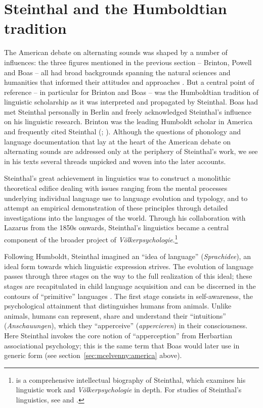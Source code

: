 \documentclass[output=paper]{langscibook}
\begin{document}
\section{Steinthal and the Humboldtian tradition}
\label{sec:mcelvenny:humboldtian}

The American debate on alternating sounds was shaped by a number of influences: the three figures mentioned in the previous section – Brinton, Powell and Boas – all had broad backgrounds spanning the natural sciences and humanities that informed their attitudes and approaches \citep[see][]{Darnell1998}. But a central point of reference – in particular for Brinton and Boas – was the Humboldtian tradition of linguistic scholarship as it was interpreted and propagated by Steinthal. Boas had met Steinthal personally in Berlin and freely acknowledged Steinthal's influence on his linguistic research. Brinton was the leading Humboldt scholar in America and frequently cited Steinthal (\citealt[see][63-69]{Bunzl1996}; \citealt[289-292]{TrautmannWaller2006}). Although the questions of phonology and language documentation that lay at the heart of the American debate on alternating sounds are addressed only at the periphery of Steinthal's work, we see in his texts several threads unpicked and woven into the later accounts.

Steinthal's great achievement in linguistics was to construct a monolithic theoretical edifice dealing with issues ranging from the mental processes underlying individual language use to language evolution and typology, and to attempt an empirical demonstration of these principles through detailed investigations into the languages of the world. Through his collaboration with Lazarus from the 1850s onwards, Steinthal's linguistics became a central component of the broader project of \emph{Völkerpsychologie}.\footnote{\citet{TrautmannWaller2006} is a comprehensive intellectual biography of Steinthal, which examines his linguistic work and \emph{Völkerpsychologie} in depth. For studies of Steinthal's linguistics, see \citet{Bumann1965} and \citet{Ringmacher1996}.} 

Following Humboldt, Steinthal imagined an ``idea of language'' (\emph{Sprachidee}), an ideal form towards which linguistic expression strives. The evolution of language passes through three stages on the way to the full realization of this ideal; these stages are recapitulated in child language acquisition and can be discerned in the contours of ``primitive'' languages \citep[cf.][81-93]{Bumann1965}. The first stage consists in self-awareness, the psychological attainment that distinguishes humans from animals. Unlike animals, humans can represent, share and understand their ``intuitions'' (\emph{Anschauungen}), which they ``apperceive'' (\emph{appercieren}) in their consciousness. Here Steinthal invokes the core notion of ``apperception'' from Herbartian associational psychology; this is the same term that Boas would later use in generic form (see section~\ref{sec:mcelvenny:america} above). 
\end{document}

